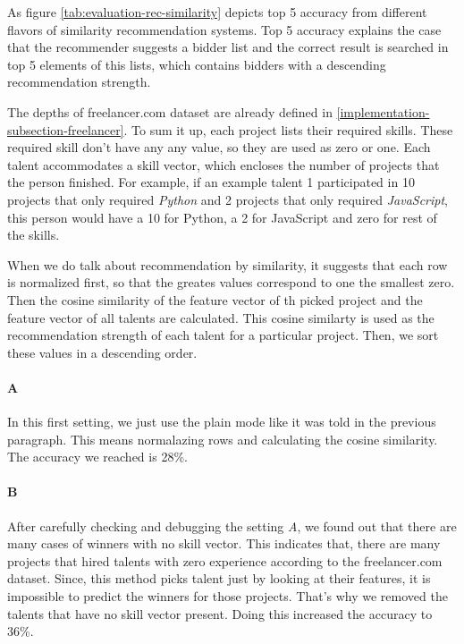 As figure \ref{tab:evaluation-rec-similarity} depicts top 5 accuracy from different flavors of similarity recommendation systems. Top 5 accuracy explains the case that the recommender suggests a bidder list and the correct result is searched in top 5 elements of this lists, which contains bidders with a descending recommendation strength. 

The depths of freelancer.com dataset are already defined in \ref{implementation-subsection-freelancer}. To sum it up, each project lists their required skills. These required skill don't have any any value, so they are used as zero or one. Each talent accommodates a skill vector, which encloses the number of projects that the person finished. For example, if an example talent 1 participated in 10 projects that only required \textit{Python} and 2 projects that only required \textit{JavaScript}, this person would have a 10 for Python, a 2 for JavaScript and zero for rest of the skills. 

When we do talk about recommendation by similarity, it suggests that each row is normalized first, so that the greates values correspond to one the smallest zero. Then the cosine similarity of the feature vector of th picked project and the feature vector of all talents are calculated. This cosine similarty is used as the recommendation strength of each talent for a particular project. Then, we sort these values in a descending order. 

\paragraph{A} In this first setting, we just use the plain mode like it was told in the previous paragraph. This means normalazing rows and calculating the cosine similarity. The accuracy we reached is 28\%. 

\paragraph{B} After carefully checking and debugging the setting \textit{A}, we found out that there are many cases of winners with no skill vector. This indicates that, there are many projects that hired talents with zero experience according to the freelancer.com dataset. Since, this method picks talent just by looking at their features, it is impossible to predict the winners for those projects. That's why we removed the talents that have no skill vector present. Doing this increased the accuracy to 36\%. 

